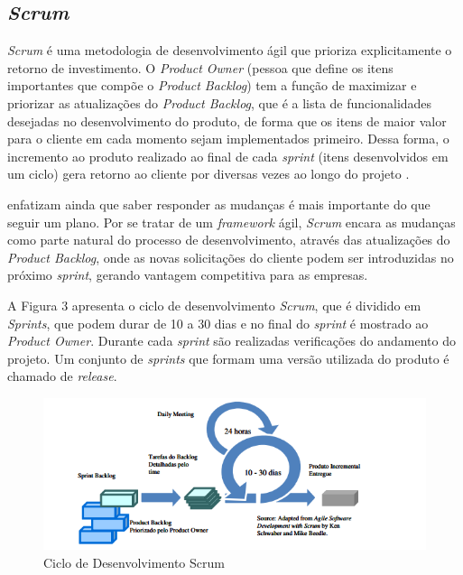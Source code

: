 \documentclass[
	12pt,				%
    oneside,			%
	a4paper,			%
	english,			%
	french,				%
	spanish,			%
	brazil,				%
	]{abntex2}
\begin{document}
\subsection{\textit{Scrum}}
\textit{Scrum} é uma metodologia de desenvolvimento ágil que prioriza explicitamente
o retorno de investimento. O \textit{Product Owner} (pessoa que define os itens importantes
que compõe o \textit{Product Backlog}) tem a função de maximizar e priorizar as atualizações
do \textit{Product Backlog}, que é a lista de funcionalidades desejadas no desenvolvimento
do produto, de forma que os itens de maior valor para o cliente em cada momento
sejam implementados primeiro. Dessa forma, o incremento ao produto realizado ao
final de cada \textit{sprint} (itens desenvolvidos em um ciclo) gera retorno ao cliente por
diversas vezes ao longo do projeto \cite{machado}. 

 enfatizam ainda que saber responder as mudanças é mais
importante do que seguir um plano. Por se tratar de um \textit{framework} ágil, \textit{Scrum} encara 
as mudanças como parte natural do processo de desenvolvimento, através das
atualizações do \textit{Product Backlog}, onde as novas solicitações do cliente podem ser
introduzidas no próximo \textit{sprint}, gerando vantagem competitiva para as empresas.

A Figura 3 apresenta o ciclo de desenvolvimento \textit{Scrum}, que é dividido em
\textit{Sprints}, que podem durar de 10 a 30 dias e no final do \textit{sprint} é mostrado ao \textit{Product
Owner}. Durante cada \textit{sprint} são realizadas verificações do andamento do projeto. Um
conjunto de \textit{sprints} que formam uma versão utilizada do produto é chamado de
\textit{release}.
\cleardoublepage

\begin{figure} [hbt] 
\begin{center}
\includegraphics[width=1\textwidth]{scrum.png}
\end{center}
\label{figura1} 
\caption{Ciclo de Desenvolvimento Scrum \cite{vascharim}}
\end{figure}
\end{document}
